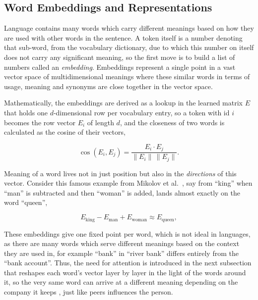 \subsection{Word Embeddings and Representations}
\label{subsec:word-embeddings}

Language contains many words which carry different meanings based on how they are used with other words in the sentence. A token itself is a number denoting that sub-word, from the vocabulary dictionary, due to which this number on itself does not carry any significant meaning, so the first move is to build a list of numbers called an \emph{embedding}. Embeddings represent a single point in a vast vector space of multidimensional meanings where these similar words in terms of usage, meaning and synonyms are close together in the vector space.

Mathematically, the embeddings are derived as a lookup in the learned matrix $E$ that holds one $d$-dimensional row per vocabulary entry, so a token with id $i$ becomes the row vector $E_i$ of length $d$, and the closeness of two words is calculated as the cosine of their vectors,

\begin{equation}\label{eq:cosine}
  \cos(E_i, E_j) = \frac{E_i \cdot E_j}{\lVert E_i\rVert \, \lVert E_j\rVert} .
\end{equation}

Meaning of a word lives not in just position but also in the \emph{directions} of this vector. Consider this famous example from Mikolov et al.\ \cite{mikolov2013efficientestimationwordrepresentations}, say from ``king'' when ``man'' is subtracted and then ``woman'' is added, lands almost exactly on the word ``queen'',

\begin{equation}\label{eq:analogy}
  E_{\text{king}} - E_{\text{man}} + E_{\text{woman}} \approx E_{\text{queen}} ,
\end{equation}

These embeddings give one fixed point per word, which is not ideal in languages, as there are many words which serve different meanings based on the context they are used in, for example ``bank'' in ``river bank'' differs entirely from the ``bank account''. Thus, the need for attention is introduced in the next subsection that reshapes each word's vector layer by layer in the light of the words around it, so the very same word can arrive at a different meaning depending on the company it keeps \cite{devlin2019bertpretrainingdeepbidirectional}, just like peers influences the person.

